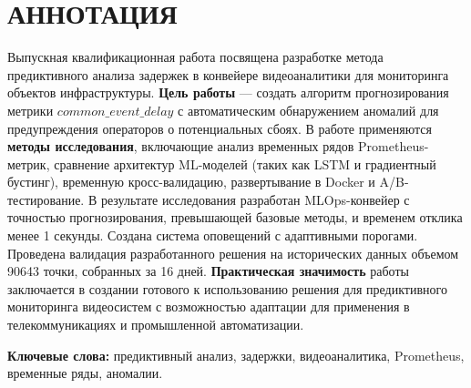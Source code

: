 \chapter*{АННОТАЦИЯ}

\hspace*{1.25cm}Выпускная квалификационная работа посвящена разработке метода предиктивного анализа задержек в конвейере видеоаналитики для мониторинга объектов инфраструктуры. \textbf{Цель работы} --- создать алгоритм прогнозирования метрики $common\_event\_delay$ с автоматическим обнаружением аномалий для предупреждения операторов о потенциальных сбоях. В работе применяются \textbf{методы исследования}, включающие анализ временных рядов Prometheus-метрик, сравнение архитектур ML-моделей (таких как LSTM и градиентный бустинг), временную кросс-валидацию, развертывание в Docker и A/B-тестирование. В результате исследования разработан MLOps-конвейер с точностью прогнозирования, превышающей базовые методы, и временем отклика менее 1 секунды. Создана система оповещений с адаптивными порогами. Проведена валидация разработанного решения на исторических данных объемом 90643 точки, собранных за 16 дней. \textbf{Практическая значимость} работы заключается в создании готового к использованию решения для предиктивного мониторинга видеосистем с возможностью адаптации для применения в телекоммуникациях и промышленной автоматизации.

\vspace*{1cm}
\hspace*{1.25cm}\textbf{Ключевые слова:} предиктивный анализ, задержки, видеоаналитика, Prometheus, временные ряды, аномалии.

\newpage 